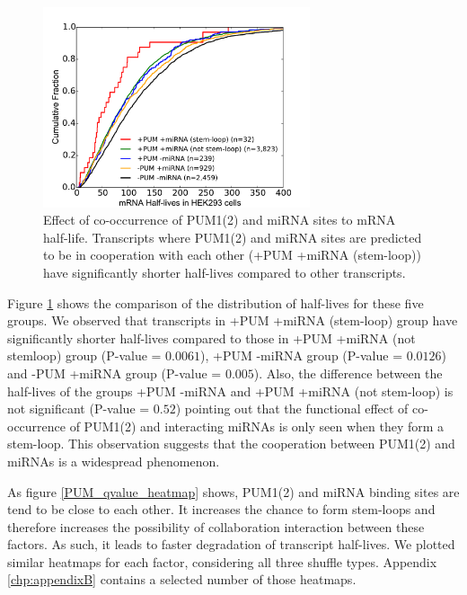 \begin{figure}[H]
	\centering
	\includegraphics[width=0.7\textwidth,clip]{ch4_results_discussion/figures/Figure6}

\caption[Effect of co-occurrence of PUM1(2) and miRNA sites to mRNA half-life]{Effect of co-occurrence of PUM1(2) and miRNA sites to mRNA half-life. Transcripts where PUM1(2) and miRNA sites are predicted to be in cooperation with each other (+PUM +miRNA (stem-loop)) have significantly shorter half-lives compared to other transcripts.}
\label{PUM_revcomp}
\end{figure}

Figure \ref{PUM_revcomp} shows the comparison of the distribution of half-lives for these five groups. We observed that transcripts in +PUM +miRNA (stem-loop) group have significantly shorter half-lives compared to those in +PUM +miRNA (not stemloop) group (P-value = $0.0061$), +PUM -miRNA group (P-value = $0.0126$) and -PUM +miRNA group (P-value = $0.005$). Also, the difference between the half-lives of the groups +PUM -miRNA and +PUM +miRNA (not stem-loop) is not significant (P-value = $0.52$) pointing out that the functional effect of co-occurrence of PUM1(2) and interacting miRNAs is only seen when they form a stem-loop. This observation suggests that the cooperation between PUM1(2) and miRNAs is a widespread phenomenon.

As figure \ref{PUM_qvalue_heatmap} shows, PUM1(2) and miRNA binding sites are tend to be close to each other. It increases the chance to form stem-loops and therefore increases the possibility of collaboration interaction between these factors. As such, it leads to faster degradation of transcript half-lives. We plotted similar heatmaps for each factor, considering all three shuffle types. Appendix \ref{chp:appendixB} contains a selected number of those heatmaps.

